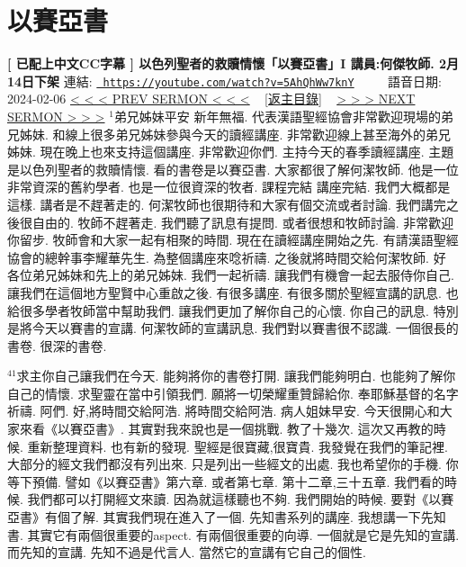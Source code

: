 \documentclass{book}
\begin{document}
\section{以賽亞書}
\label{sec:5AhQhWw7knY}
\textbf{[ 已配上中文CC字幕 ] 以色列聖者的救贖情懷「以賽亞書」I 講員:何傑牧師. 2月14日下架}
\newline
\newline
連結: \href{https://youtube.com/watch?v=5AhQhWw7knY}{\texttt{ https://youtube.com/watch?v=5AhQhWw7knY}} ~~~~ 語音日期: 2024-02-06 
\newline
\newline
\hyperref[sec:FsXNMWFwxHg]{\small{< < < PREV SERMON < < <}}
~
\hyperref[sec:index]{\small{[返主目錄]}}
~
\hyperref[sec:KwXlOVraPWE]{\small{> > > NEXT SERMON > > >}}
\newline
\newline
$^{1}$弟兄姊妹平安 新年無福.
代表漢語聖經協會非常歡迎現場的弟兄姊妹.
和線上很多弟兄姊妹參與今天的讀經講座.
非常歡迎線上甚至海外的弟兄姊妹.
現在晚上也來支持這個講座.
非常歡迎你們.
主持今天的春季讀經講座.
主題是以色列聖者的救贖情懷.
看的書卷是以賽亞書.
大家都很了解何潔牧師.
他是一位非常資深的舊約學者.
也是一位很資深的牧者.
課程完結 講座完結.
我們大概都是這樣.
講者是不趕著走的.
何潔牧師也很期待和大家有個交流或者討論.
我們講完之後很自由的.
牧師不趕著走.
我們聽了訊息有提問.
或者很想和牧師討論.
非常歡迎你留步.
牧師會和大家一起有相聚的時間.
現在在讀經講座開始之先.
有請漢語聖經協會的總幹事李耀華先生.
為整個講座來唸祈禱.
之後就將時間交給何潔牧師.
好 各位弟兄姊妹和先上的弟兄姊妹.
我們一起祈禱.
讓我們有機會一起去服侍你自己.
讓我們在這個地方聖賢中心重啟之後.
有很多講座.
有很多關於聖經宣講的訊息.
也給很多學者牧師當中幫助我們.
讓我們更加了解你自己的心懷.
你自己的訊息.
特別是將今天以賽書的宣講.
何潔牧師的宣講訊息.
我們對以賽書很不認識.
一個很長的書卷.
很深的書卷.

$^{41}$求主你自己讓我們在今天.
能夠將你的書卷打開.
讓我們能夠明白.
也能夠了解你自己的情懷.
求聖靈在當中引領我們.
願將一切榮耀重贊歸給你.
奉耶穌基督的名字祈禱.
阿們.
好,將時間交給阿浩.
將時間交給阿浩.
病人姐妹早安.
今天很開心和大家來看《以賽亞書》.
其實對我來說也是一個挑戰.
教了十幾次.
這次又再教的時候.
重新整理資料.
也有新的發現.
聖經是很寶藏,很寶貴.
我發覺在我們的筆記裡.
大部分的經文我們都沒有列出來.
只是列出一些經文的出處.
我也希望你的手機.
你等下預備.
譬如《以賽亞書》第六章.
或者第七章.
第十二章,三十五章.
我們看的時候.
我們都可以打開經文來讀.
因為就這樣聽也不夠.
我們開始的時候.
要對《以賽亞書》有個了解.
其實我們現在進入了一個.
先知書系列的講座.
我想講一下先知書.
其實它有兩個很重要的aspect.
有兩個很重要的向導.
一個就是它是先知的宣講.
而先知的宣講.
先知不過是代言人.
當然它的宣講有它自己的個性.
\end{document}
